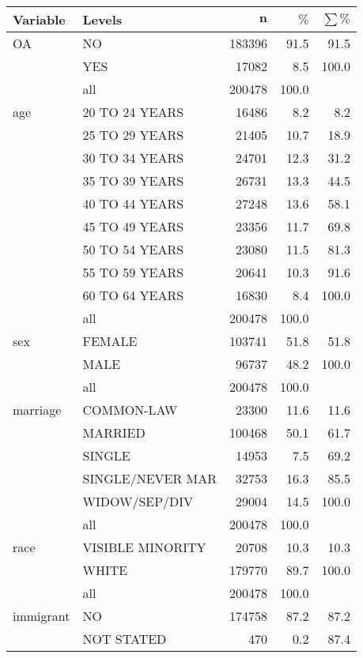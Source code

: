 \begingroup\footnotesize
\begin{longtable}{ll|rrr}
 \textbf{Variable} & \textbf{Levels} & $\mathbf{n}$ & $\mathbf{\%}$ & $\mathbf{\sum \%}$ \\ 
  \hline
OA & NO & 183396 & 91.5 & 91.5 \\ 
   & YES & 17082 & 8.5 & 100.0 \\ 
   \hline
 & all & 200478 & 100.0 &  \\ 
   \hline
\hline
age & 20 TO 24 YEARS & 16486 & 8.2 & 8.2 \\ 
   & 25 TO 29 YEARS & 21405 & 10.7 & 18.9 \\ 
   & 30 TO 34 YEARS & 24701 & 12.3 & 31.2 \\ 
   & 35 TO 39 YEARS & 26731 & 13.3 & 44.5 \\ 
   & 40 TO 44 YEARS & 27248 & 13.6 & 58.1 \\ 
   & 45 TO 49 YEARS & 23356 & 11.7 & 69.8 \\ 
   & 50 TO 54 YEARS & 23080 & 11.5 & 81.3 \\ 
   & 55 TO 59 YEARS & 20641 & 10.3 & 91.6 \\ 
   & 60 TO 64 YEARS & 16830 & 8.4 & 100.0 \\ 
   \hline
 & all & 200478 & 100.0 &  \\ 
   \hline
\hline
sex & FEMALE & 103741 & 51.8 & 51.8 \\ 
   & MALE & 96737 & 48.2 & 100.0 \\ 
   \hline
 & all & 200478 & 100.0 &  \\ 
   \hline
\hline
marriage & COMMON-LAW & 23300 & 11.6 & 11.6 \\ 
   & MARRIED & 100468 & 50.1 & 61.7 \\ 
   & SINGLE & 14953 & 7.5 & 69.2 \\ 
   & SINGLE/NEVER MAR & 32753 & 16.3 & 85.5 \\ 
   & WIDOW/SEP/DIV & 29004 & 14.5 & 100.0 \\ 
   \hline
 & all & 200478 & 100.0 &  \\ 
   \hline
\hline
race & VISIBLE MINORITY & 20708 & 10.3 & 10.3 \\ 
   & WHITE & 179770 & 89.7 & 100.0 \\ 
   \hline
 & all & 200478 & 100.0 &  \\ 
   \hline
\hline
immigrant & NO & 174758 & 87.2 & 87.2 \\ 
   & NOT STATED & 470 & 0.2 & 87.4 \\ 

\end{longtable}
